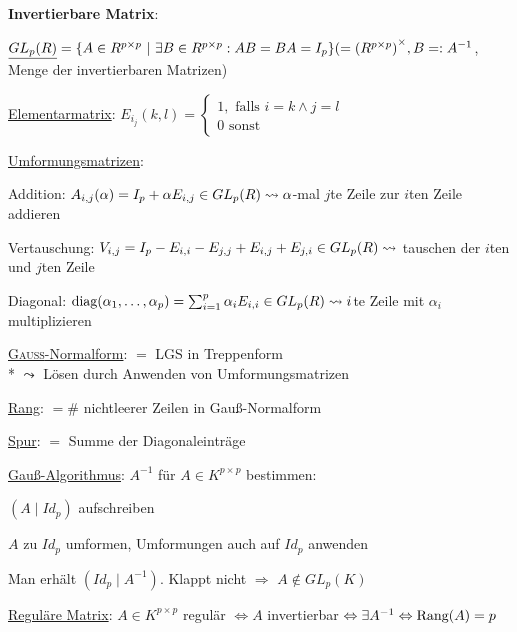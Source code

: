   \textbf{Invertierbare Matrix}:
  \begin{items}
    \item $\underline{GL_p(R)}=\{ A \in R^{p \times p}\ |\  \exists B \in R^{p \times p} : AB=BA=I_p \} \\* (={(R^{p \times p})}^{\times}, B=:A^{-1}$, Menge der invertierbaren Matrizen)
    \item \underline{Elementarmatrix}: $E_{i_j}(k,l)=\begin{cases} 1, \text{ falls } i=k \wedge j=l \\ 0 \text{ sonst} \end{cases}$
    \item \underline{Umformungsmatrizen}:
    \begin{enumeration}
      \item Addition: $A_{i,j}(\alpha)=I_p+\alpha E_{i,j} \in GL_p(R) \\* \leadsto \alpha$-mal $j$te Zeile zur $i$ten Zeile addieren
      \item Vertauschung: $V_{i,j}=I_p-E_{i,i}-E_{j,j}+E_{i,j}+E_{j,i} \in GL_p(R) \\* \leadsto$ tauschen der $i$ten und $j$ten Zeile
      \item Diagonal: $\text{diag}(\alpha_1,\dots,\alpha_p)=\sum_{i=1}^p \alpha_i E_{i,i} \in GL_p(R) \\* \leadsto i$te Zeile mit $\alpha_i$ multiplizieren
    \end{enumeration}
    \item \underline{\textsc{Gauß}-Normalform}: $=$ LGS in Treppenform \\*
       $\leadsto$ Lösen durch Anwenden von Umformungsmatrizen
    \item \underline{Rang}: $= \#$ nichtleerer Zeilen in Gauß-Normalform
    \item \underline{Spur}: $=$ Summe der Diagonaleinträge
    \item \underline{Gauß-Algorithmus}: $A^{-1}$ für $A \in K^{p \times p}$ bestimmen:
    \begin{enumeration}
      \item $(A \mid Id_p)$ aufschreiben
      \item $A$ zu $Id_p$ umformen, Umformungen auch auf $Id_p$ anwenden
      \item Man erhält $(Id_p \mid A^{-1})$. Klappt nicht $\Rightarrow$ $A \not \in GL_p(K)$
    \end{enumeration}
    \item \underline{Reguläre Matrix}: $A \in K^{p \times p}$ regulär $\Leftrightarrow A$ invertierbar $\Leftrightarrow \exists A^{-1} \\* \Leftrightarrow \text{Rang}(A)=p$

\end{items}
